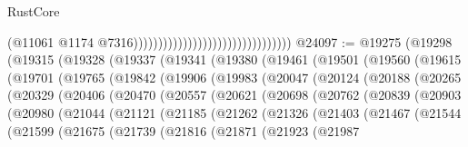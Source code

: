 \begin{lexlean}{RustCore}
\begin{coremodule}
                                                                  (@11061
                                                                    @1174
                                                                    @7316))))))))))))))))))))))))))))))))
@24097 := @19275
    (@19298
      (@19315
        (@19328
          (@19337
            (@19341
              (@19380
                (@19461
                  (@19501
                    (@19560
                      (@19615
                        (@19701
                          (@19765
                            (@19842
                              (@19906
                                (@19983
                                  (@20047
                                    (@20124
                                      (@20188
                                        (@20265
                                          (@20329
                                            (@20406
                                              (@20470
                                                (@20557
                                                  (@20621
                                                    (@20698
                                                      (@20762
                                                        (@20839
                                                          (@20903
                                                            (@20980
                                                              (@21044
                                                                (@21121
                                                                  (@21185
                                                                    (@21262
                                                                      (@21326
                                                                        (@21403
                                                                          (@21467
                                                                            (@21544
                                                                              (@21599
                                                                                (@21675
                                                                                  (@21739
                                                                                    (@21816
                                                                                      (@21871
                                                                                        (@21923
                                                                                          (@21987

\end{coremodule}
\end{lexlean}
